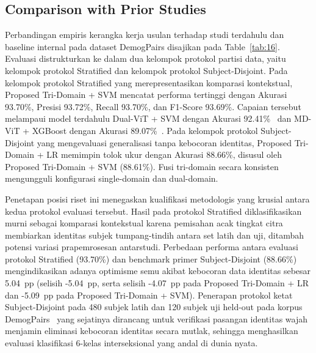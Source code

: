 \subsection{Comparison with Prior Studies}
\label{sec:comparison_with_prior_studies}
\label{sec:comparison_prior}

Perbandingan empiris kerangka kerja usulan terhadap studi terdahulu dan baseline internal pada dataset DemogPairs disajikan pada Table~\ref{tab:16}. Evaluasi distrukturkan ke dalam dua kelompok protokol partisi data, yaitu kelompok protokol Stratified dan kelompok protokol Subject-Disjoint. Pada kelompok protokol Stratified yang merepresentasikan komparasi kontekstual, Proposed Tri-Domain + SVM mencatat performa tertinggi dengan Akurasi 93.70\%, Presisi 93.72\%, Recall 93.70\%, dan F1-Score 93.69\%. Capaian tersebut melampaui model terdahulu Dual-ViT + SVM dengan Akurasi 92.41\%~\cite{ref19} dan MD-ViT + XGBoost dengan Akurasi 89.07\%~\cite{ref20}. Pada kelompok protokol Subject-Disjoint yang mengevaluasi generalisasi tanpa kebocoran identitas, Proposed Tri-Domain + LR memimpin tolok ukur dengan Akurasi 88.66\%, disusul oleh Proposed Tri-Domain + SVM (88.61\%). Fusi tri-domain secara konsisten mengungguli konfigurasi single-domain dan dual-domain.

Penetapan posisi riset ini menegaskan kualifikasi metodologis yang krusial antara kedua protokol evaluasi tersebut. Hasil pada protokol Stratified diklasifikasikan murni sebagai komparasi kontekstual karena pemisahan acak tingkat citra membiarkan identitas subjek tumpang-tindih antara set latih dan uji, ditambah potensi variasi prapemrosesan antarstudi. Perbedaan performa antara evaluasi protokol Stratified (93.70\%) dan benchmark primer Subject-Disjoint (88.66\%) mengindikasikan adanya optimisme semu akibat kebocoran data identitas sebesar 5.04~pp (selisih -5.04~pp, serta selisih -4.07~pp pada Proposed Tri-Domain + LR dan -5.09~pp pada Proposed Tri-Domain + SVM). Penerapan protokol ketat Subject-Disjoint pada 480 subjek latih dan 120 subjek uji held-out pada korpus DemogPairs~\cite{ref25} yang sejatinya dirancang untuk verifikasi pasangan identitas wajah menjamin eliminasi kebocoran identitas secara mutlak, sehingga menghasilkan evaluasi klasifikasi 6-kelas interseksional yang andal di dunia nyata.
